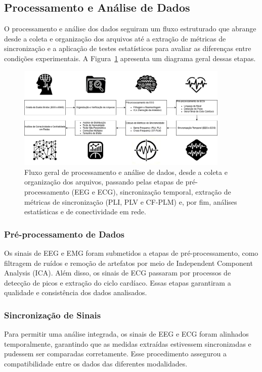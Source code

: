 \subsection{Processamento e Análise de Dados}

O processamento e análise dos dados seguiram um fluxo estruturado que abrange desde a coleta e organização dos arquivos até a extração de métricas de sincronização e a aplicação de testes estatísticos para avaliar as diferenças entre condições experimentais. A Figura~\ref{fig:fluxo_processamento} apresenta um diagrama geral dessas etapas.

\begin{figure}[htb]
    \centering
    \includegraphics[width=0.9\textwidth]{figs/0_intro_e_desenho_experimental/diagrama_processamento_e_analise_drawio.png}
    \caption{Fluxo geral de processamento e análise de dados, desde a coleta e organização dos arquivos, passando pelas etapas de pré-processamento (EEG e ECG), sincronização temporal, extração de métricas de sincronização (PLI, PLV e CF-PLM) e, por fim, análises estatísticas e de conectividade em rede.}
    \label{fig:fluxo_processamento}
\end{figure}

\subsubsection{Pré-processamento de Dados}
Os sinais de EEG e EMG foram submetidos a etapas de pré-processamento, como filtragem de ruídos e remoção de artefatos por meio de Independent Component Analysis (ICA). Além disso, os sinais de ECG passaram por processos de detecção de picos e extração do ciclo cardíaco. Essas etapas garantiram a qualidade e consistência dos dados analisados.

\subsubsection{Sincronização de Sinais}
Para permitir uma análise integrada, os sinais de EEG e ECG foram alinhados temporalmente, garantindo que as medidas extraídas estivessem sincronizadas e pudessem ser comparadas corretamente. Esse procedimento assegurou a compatibilidade entre os dados das diferentes modalidades.

